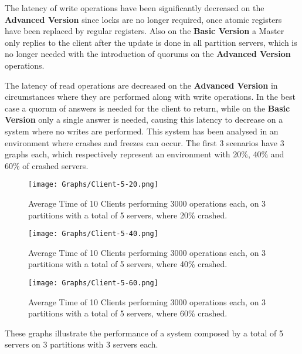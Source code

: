 \documentclass[times, 10pt,twocolumn]{article}
\begin{document}
The latency of write operations have been significantly decreased on the \textbf{Advanced Version} since locks are no longer required, once atomic registers have been replaced by regular registers. Also on the \textbf{Basic Version} a Master only replies to the client after the update is done in all partition servers, which is no longer needed with the introduction of quorums on the \textbf{Advanced Version} operations.

The latency of read operations are decreased on the \textbf{Advanced Version} in circumstances where they are performed along with write operations. In the best case a quorum of answers is needed for the client to return, while on the \textbf{Basic Version} only a single answer is needed, causing this latency to decrease on a system where no writes are performed.
This system has been analysed in an environment where crashes and freezes can occur. The first 3 scenarios have 3 graphs each, which respectively represent an environment with 20\%, 40\% and 60\% of crashed servers.
\begin{figure}[h!]
	\centering
	\texttt{[image: Graphs/Client-5-20.png]}
	\caption{Average Time of 10 Clients performing 3000 operations each, on 3 partitions with a total of 5 servers, where 20\% crashed.}
\end{figure}
\newpage
\begin{figure}[h!]
	\centering
	\texttt{[image: Graphs/Client-5-40.png]}
	\caption{Average Time of 10 Clients performing 3000 operations each, on 3 partitions with a total of 5 servers, where 40\% crashed.}
	\vspace{0.15in}
	\centering
	\texttt{[image: Graphs/Client-5-60.png]}
	\caption{Average Time of 10 Clients performing 3000 operations each, on 3 partitions with a total of 5 servers, where 60\% crashed.}
\end{figure}
These graphs illustrate the performance of a system composed by a total of 5 servers on 3 partitions with 3 servers each.
\end{document}
